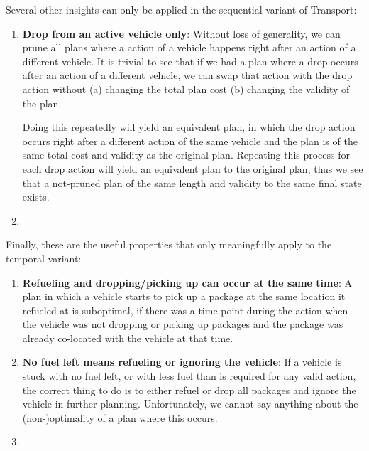Several other insights can only be applied in the sequential variant of Transport:
\begin{enumerate}
\item \textbf{Drop from an active vehicle only}: Without loss of generality,
we can prune all plans where a \drop{} action of a vehicle happens
right after an action of a different vehicle. It is trivial to see that if we had a plan where a drop
occurs after an action of a different vehicle, we can swap that action with the drop
action without (a) changing the total plan cost (b) changing the validity of the plan.

Doing this repeatedly will yield an equivalent plan, in which the drop action
occurs right after a different action of the same vehicle and the plan is of the same total cost and validity as the original plan. Repeating this process for each drop action will yield an equivalent plan to the original plan, thus we see that a not-pruned plan of the same length and validity to the same final state exists.

\item \textbf{}
\end{enumerate}
Finally, these are the useful properties that only meaningfully apply to the temporal variant:
\begin{enumerate}
\item \textbf{Refueling and dropping/picking up can occur at the same time}: 
A plan in which a vehicle starts to pick up a package at the same location it refueled at is suboptimal, if there was a time point during the  action
when the vehicle was not dropping or picking up packages and the package was already
co-located with the vehicle at that time.

\item \textbf{No fuel left means refueling or ignoring the vehicle}:
If a vehicle is stuck with no fuel left, or with less fuel than is required for
any valid \drive{} action, the correct thing to do is to either refuel or drop
all packages and ignore the vehicle in further planning. Unfortunately,
we cannot say anything about the (non-)optimality of a plan where this occurs.

\item \textbf{}
\end{enumerate}

















